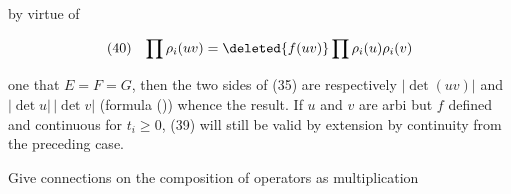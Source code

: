 by virtue of

\[
\begin{array}{ll}(40)&\displaystyle\prod\rho_i(uv)=\deleted{f(uv)}\prod\rho_i(u)\rho_i(v)\end{array}
\]

  one    that $E=F=G$, then the two sides of (35) are respectively $|\det(uv)|$ and $|\det u|\,|\det v|$ (formula ()) whence the result. If $u$ and $v$ are arbi but $f$ defined and continuous for $t_i\geq0$, (39) will still be valid by extension by continuity from the preceding case.

Give connections on the composition of operators as multiplication

\reversemarginpar{}\normalmarginpar
